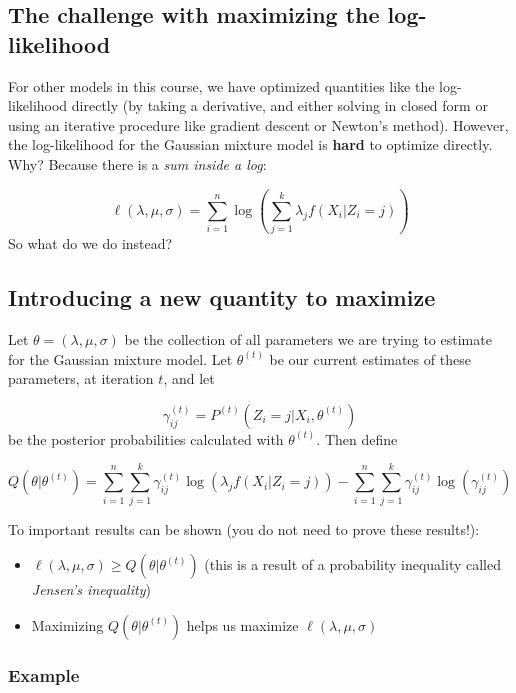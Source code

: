 \documentclass[12pt]{article}
\begin{document}
\newpage

\subsection*{The challenge with maximizing the log-likelihood}

For other models in this course, we have optimized quantities like the log-likelihood directly (by taking a derivative, and either solving in closed form or using an iterative procedure like gradient descent or Newton's method). However, the log-likelihood for the Gaussian mixture model is \textbf{hard} to optimize directly.\\

Why? Because there is a \textit{sum inside a log}:

$$\ell(\lambda, \mu, \sigma) = \sum \limits_{i=1}^n \log \left( \sum \limits_{j=1}^k \lambda_j f(X_i | Z_i = j) \right)$$
So what do we do instead?

\subsection*{Introducing a new quantity to maximize}

Let $\theta = (\lambda, \mu, \sigma)$ be the collection of all parameters we are trying to estimate for the Gaussian mixture model. Let $\theta^{(t)}$ be our current estimates of these parameters, at iteration $t$, and let

$$\gamma_{ij}^{(t)} = P^{(t)}(Z_i = j | X_i, \theta^{(t)})$$
be the posterior probabilities calculated with $\theta^{(t)}$. Then define

$$Q(\theta | \theta^{(t)}) = \sum \limits_{i=1}^n \sum \limits_{j=1}^k \gamma_{ij}^{(t)} \log (\lambda_j f(X_i | Z_i = j)) - \sum \limits_{i=1}^n \sum \limits_{j=1}^k \gamma_{ij}^{(t)} \log(\gamma_{ij}^{(t)})$$

To important results can be shown (you do not need to prove these results!):

\begin{itemize}
\item $\ell(\lambda, \mu, \sigma) \geq Q(\theta | \theta^{(t)})$ (this is a result of a probability inequality called \textit{Jensen's inequality})

\item Maximizing $Q(\theta | \theta^{(t)})$ helps us maximize $\ell(\lambda, \mu, \sigma)$
\end{itemize}

\subsubsection*{Example}
\end{document}
